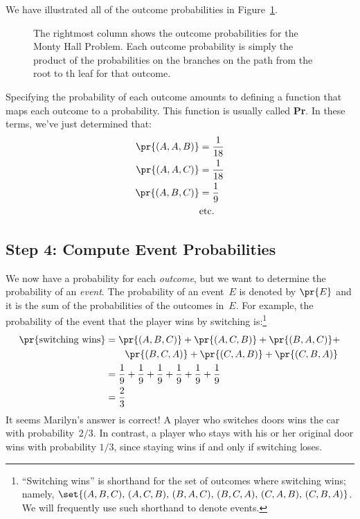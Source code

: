 We have illustrated all of the outcome probabilities in
Figure~\ref{fig:14A6}.

\begin{figure}[h]


\caption{The rightmost column shows the outcome probabilities for the
  Monty Hall Problem.  Each outcome probability is simply the product
  of the probabilities on the branches on the path from the root to th
  leaf for that outcome.}

\label{fig:14A6}
\end{figure}

Specifying the probability of each outcome amounts to defining a
function that maps each outcome to a probability.  This function is
usually called \textbf{Pr}.  In these terms, we've just determined
that:
%
\begin{align*}
\pr{(A, A, B)} & = \frac{1}{18} \\
\pr{(A, A, C)} & = \frac{1}{18} \\
\pr{(A, B, C)} & = \frac{1}{9} \\
               & \text{etc.}
\end{align*}

\subsection{Step 4: Compute Event Probabilities}

We now have a probability for each \emph{outcome}, but we want to
determine the probability of an \emph{event}.  The probability of an
event~$E$ is denoted by $\pr{E}$ and it is the sum of the
probabilities of the outcomes in~$E$.  For example, the probability of
the event that the player wins by switching is:\footnote{``Switching
  wins'' is shorthand for the set of outcomes where switching wins;
  namely, $\set{ (A, B, C),\, (A, C, B),\, (B, A, C), \, (B, C, A), \,
    (C, A, B), \, (C, B, A) }$. We will frequently use such shorthand
  to denote events.}
%
\begin{align*}
\pr{\text{switching wins}}
    & = \pr{(A, B, C)} + \pr{(A, C, B)} + \pr{(B, A, C)} + \\
    & \qquad \pr{(B, C, A)} + \pr{(C, A, B)} + \pr{(C, B, A)} \\
    & = \frac{1}{9} + \frac{1}{9} + \frac{1}{9} +
        \frac{1}{9} + \frac{1}{9} + \frac{1}{9} \\
    & = \frac{2}{3}
\end{align*}
%
It seems Marilyn's answer is correct!  A player who switches doors
wins the car with probability~$2/3$.  In contrast, a player who stays
with his or her original door wins with probability $1/3$, since
staying wins if and only if switching loses.

